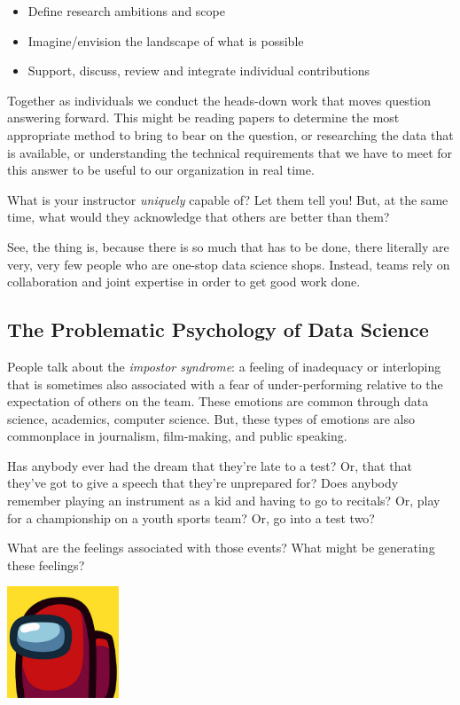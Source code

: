 \documentclass[
]{book}
\providecommand{\tightlist}{%
  \setlength{\itemsep}{0pt}\setlength{\parskip}{0pt}}
\theoremstyle{definition}
\theoremstyle{definition}
\theoremstyle{definition}
\theoremstyle{definition}
\theoremstyle{remark}
\begin{document}
\begin{itemize}
\tightlist
\item
  Define research ambitions and scope
\item
  Imagine/envision the landscape of what is possible
\item
  Support, discuss, review and integrate individual contributions
\end{itemize}

Together as individuals we conduct the heads-down work that moves question answering forward. This might be reading papers to determine the most appropriate method to bring to bear on the question, or researching the data that is available, or understanding the technical requirements that we have to meet for this answer to be useful to our organization in real time.

What is your instructor \emph{uniquely} capable of? Let them tell you! But, at the same time, what would they acknowledge that others are better than them?

See, the thing is, because there is so much that has to be done, there literally are very, very few people who are one-stop data science shops. Instead, teams rely on collaboration and joint expertise in order to get good work done.

\hypertarget{the-problematic-psychology-of-data-science}{%
\subsection{The Problematic Psychology of Data Science}\label{the-problematic-psychology-of-data-science}}

People talk about the \emph{impostor syndrome}: a feeling of inadequacy or interloping that is sometimes also associated with a fear of under-performing relative to the expectation of others on the team. These emotions are common through data science, academics, computer science. But, these types of emotions are also commonplace in journalism, film-making, and public speaking.

Has anybody ever had the dream that they're late to a test? Or, that that they've got to give a speech that they're unprepared for? Does anybody remember playing an instrument as a kid and having to go to recitals? Or, play for a championship on a youth sports team? Or, go into a test two?

What are the feelings associated with those events? What might be generating these feelings?

\includegraphics[width=0.25\textwidth,height=\textheight]{images/among_us.jpeg}
\end{document}
